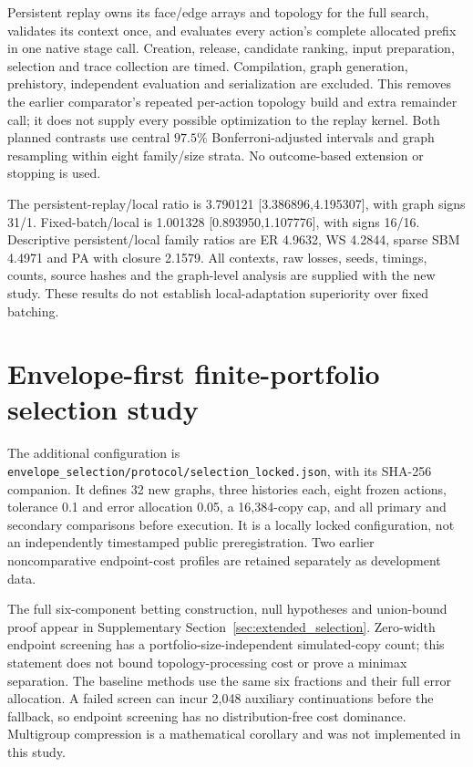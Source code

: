 \documentclass[preprint,11pt,sort&compress]{elsarticle}
\begin{document}
Persistent replay owns its face/edge arrays and topology for the full search, validates its context once, and evaluates every action's complete allocated prefix in one native stage call. Creation, release, candidate ranking, input preparation, selection and trace collection are timed. Compilation, graph generation, prehistory, independent evaluation and serialization are excluded. This removes the earlier comparator's repeated per-action topology build and extra remainder call; it does not supply every possible optimization to the replay kernel. Both planned contrasts use central $97.5\%$ Bonferroni-adjusted intervals and graph resampling within eight family/size strata. No outcome-based extension or stopping is used.

The persistent-replay/local ratio is 3.790121 [3.386896,4.195307], with graph signs 31/1. Fixed-batch/local is 1.001328 [0.893950,1.107776], with signs 16/16. Descriptive persistent/local family ratios are ER 4.9632, WS 4.2844, sparse SBM 4.4971 and PA with closure 2.1579. All contexts, raw losses, seeds, timings, counts, source hashes and the graph-level analysis are supplied with the new study. These results do not establish local-adaptation superiority over fixed batching.



\FloatBarrier\section{Envelope-first finite-portfolio selection study}
The additional configuration is \texttt{envelope\_selection/protocol/selection\_locked.json}, with its SHA-256 companion. It defines 32 new graphs, three histories each, eight frozen actions, tolerance 0.1 and error allocation 0.05, a 16,384-copy cap, and all primary and secondary comparisons before execution. It is a locally locked configuration, not an independently timestamped public preregistration. Two earlier noncomparative endpoint-cost profiles are retained separately as development data.

The full six-component betting construction, null hypotheses and union-bound proof appear in Supplementary Section~\ref{sec:extended_selection}. Zero-width endpoint screening has a portfolio-size-independent simulated-copy count; this statement does not bound topology-processing cost or prove a minimax separation. The baseline methods use the same six fractions and their full error allocation. A failed screen can incur 2,048 auxiliary continuations before the fallback, so endpoint screening has no distribution-free cost dominance. Multigroup compression is a mathematical corollary and was not implemented in this study.
\end{document}
